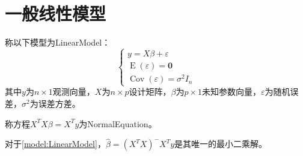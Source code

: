 \section{一般线性模型}
\begin{definition}\label{model:LinearModel}
	称以下模型为\gls{LinearModel}：
	\begin{equation*}
		\begin{cases}
			y=X\beta+\varepsilon \\
			\operatorname{E}(\varepsilon)=\mathbf{0} \\
			\operatorname{Cov}(\varepsilon)=\sigma^2I_n
		\end{cases}
	\end{equation*}
	其中$y$为$n\times 1$观测向量，$X$为$n\times p$设计矩阵，$\beta$为$p\times 1$未知参数向量，$\varepsilon$为随机误差，$\sigma^2$为误差方差。
\end{definition}
\begin{definition}
	称方程$X^TX\beta=X^Ty$为\gls{NormalEquation}。
\end{definition}
\begin{theorem}
	对于\cref{model:LinearModel}，$\hat{\beta}=(X^TX)^-X^Ty$是其唯一的最小二乘解。
\end{theorem}

